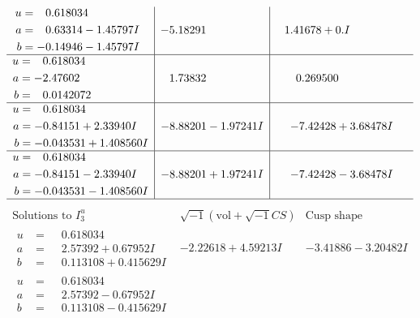 \documentclass[1p]{elsarticle_modified}
\theoremstyle{definition}
\newcommand{\I}{\sqrt{-1}}
\begin{document}
$$\begin{array}{c|c|c}
\begin{aligned}
u &= \phantom{-}0.618034\phantom{ +0.000000I} \\
a &= \phantom{-}0.63314 - 1.45797 I \\
b &= -0.14946 - 1.45797 I\end{aligned}
 & -5.18291\phantom{ +0.000000I} & \phantom{-}1.41678 + 0. I\phantom{ +0.000000I} \\ \hline\begin{aligned}
u &= \phantom{-}0.618034\phantom{ +0.000000I} \\
a &= -2.47602\phantom{ +0.000000I} \\
b &= \phantom{-}0.0142072\phantom{ +0.000000I}\end{aligned}
 & \phantom{-}1.73832\phantom{ +0.000000I} & \phantom{-}0.269500\phantom{ +0.000000I} \\ \hline\begin{aligned}
u &= \phantom{-}0.618034\phantom{ +0.000000I} \\
a &= -0.84151 + 2.33940 I \\
b &= -0.043531 + 1.408560 I\end{aligned}
 & -8.88201 - 1.97241 I & -7.42428 + 3.68478 I \\ \hline\begin{aligned}
u &= \phantom{-}0.618034\phantom{ +0.000000I} \\
a &= -0.84151 - 2.33940 I \\
b &= -0.043531 - 1.408560 I\end{aligned}
 & -8.88201 + 1.97241 I & -7.42428 - 3.68478 I\\
 \hline 
 \end{array}$$\newpage$$\begin{array}{c|c|c}  
\text{Solutions to }I^u_{3}& \I (\text{vol} + \sqrt{-1}CS) & \text{Cusp shape}\\
 \hline 
\begin{aligned}
u &= \phantom{-}0.618034\phantom{ +0.000000I} \\
a &= \phantom{-}2.57392 + 0.67952 I \\
b &= \phantom{-}0.113108 + 0.415629 I\end{aligned}
 & -2.22618 + 4.59213 I & -3.41886 - 3.20482 I \\ \hline\begin{aligned}
u &= \phantom{-}0.618034\phantom{ +0.000000I} \\
a &= \phantom{-}2.57392 - 0.67952 I \\
b &= \phantom{-}0.113108 - 0.415629 I\end{aligned}

\end{array}$$
\end{document}
